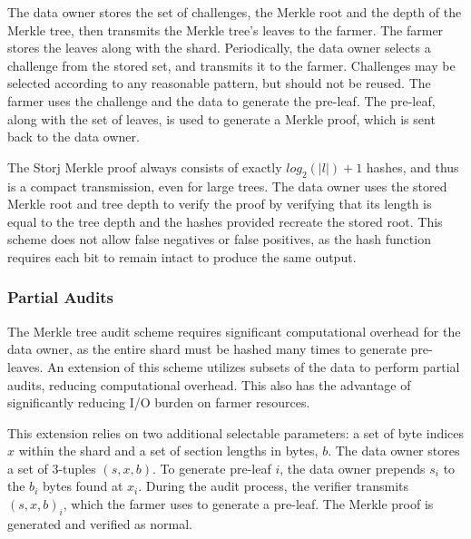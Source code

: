 \documentclass[a4paper,10pt]{article}
\begin{document}
The data owner stores the set of challenges, the Merkle root and the depth of the Merkle tree, then transmits the Merkle tree’s leaves to the farmer. The farmer stores the leaves along with the shard. Periodically, the data owner selects a challenge from the stored set, and transmits it to the farmer. Challenges may be selected according to any reasonable pattern, but should not be reused. The farmer uses the challenge and the data to generate the pre-leaf. The pre-leaf, along with the set of leaves, is used to generate a Merkle proof, which is sent back to the data owner.

The Storj Merkle proof always consists of exactly $ log_{2}(|l|)+1 $ hashes, and thus is a compact transmission, even for large trees. The data owner uses the stored Merkle root and tree depth to verify the proof by verifying that its length is equal to the tree depth and the hashes provided recreate the stored root. This scheme does not allow false negatives or false positives, as the hash function requires each bit to remain intact to produce the same output.

\subsubsection{Partial Audits}
The Merkle tree audit scheme requires significant computational overhead for the data owner, as the entire shard must be hashed many times to generate pre-leaves. An extension of this scheme utilizes subsets of the data to perform partial audits, reducing computational overhead. This also has the advantage of significantly reducing I/O burden on farmer resources.

This extension relies on two additional selectable parameters: a set of byte indices $ x $ within the shard and a set of section lengths in bytes, $ b $. The data owner stores a set of 3-tuples $ (s, x, b) $. To generate pre-leaf $ i $, the data owner prepends $ s_{i} $ to the $ b_{i} $ bytes found at $ x_{i} $. During the audit process, the verifier transmits $ (s, x, b)_{i} $, which the farmer uses to generate a pre-leaf. The Merkle proof is generated and verified as normal.
\end{document}
